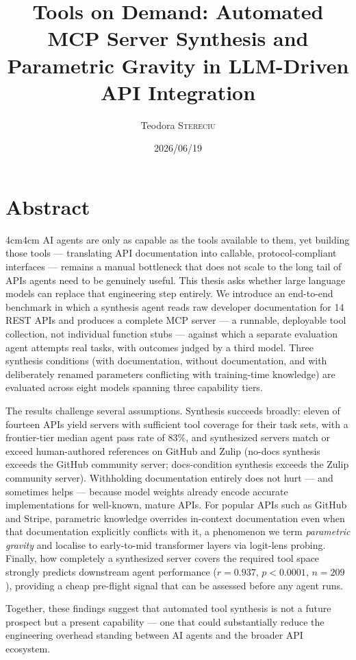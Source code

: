 \documentclass[license]{mscaithesis}  %
\title{Tools on Demand: Automated MCP Server Synthesis and Parametric Gravity in LLM-Driven API Integration}
\date{2026/06/19}
\author{Teodora \textsc{Stereciu}}
\begin{document}
\maketitle

\frontmatter
        \chapter*{Abstract}
                \begin{adjustwidth}{4cm}{4cm}
                        AI agents are only as capable as the tools available to them, yet building those tools --- translating API documentation into callable, protocol-compliant interfaces --- remains a manual bottleneck that does not scale to the long tail of APIs agents need to be genuinely useful. This thesis asks whether large language models can replace that engineering step entirely.                                           We introduce an end-to-end benchmark in which a synthesis agent reads raw developer documentation for 14 REST APIs and produces a complete MCP server --- a runnable, deployable tool collection, not individual function stubs --- against which a separate evaluation agent attempts real tasks, with outcomes judged by a third model. Three synthesis conditions (with documentation, without documentation, and with deliberately renamed parameters conflicting with training-time knowledge) are evaluated across eight models spanning three capability tiers.
                        
                        The results challenge several assumptions. Synthesis succeeds broadly: eleven of fourteen APIs yield servers with sufficient tool coverage for their task sets, with a frontier-tier median agent pass rate of 83\%, and synthesized servers match or exceed human-authored references on GitHub and Zulip (no-docs synthesis exceeds the GitHub community server; docs-condition synthesis exceeds the Zulip community server). Withholding documentation entirely does not hurt --- and sometimes helps --- because model weights already encode accurate implementations for well-known, mature APIs. For popular APIs such as GitHub and Stripe, parametric knowledge overrides in-context documentation even when that documentation explicitly conflicts with it, a phenomenon we term \emph{parametric gravity} and localise to early-to-mid transformer layers via logit-lens probing. Finally, how completely a synthesized server covers the required tool space strongly predicts downstream agent performance ($r = 0.937$, $p < 0.0001$, $n = 209$), providing a cheap pre-flight signal that can be assessed before any agent runs.
                        
                        Together, these findings suggest that automated tool synthesis is not a future prospect but a present capability --- one that could substantially reduce the engineering overhead standing between AI agents and the broader API ecosystem.
\end{adjustwidth}
\end{document}
